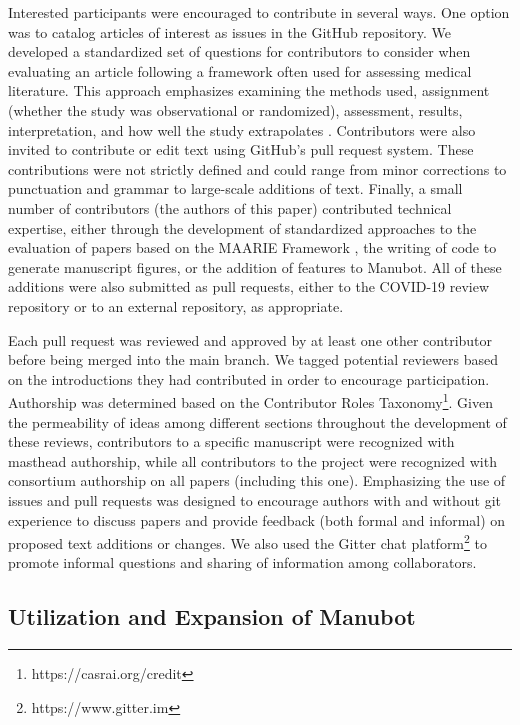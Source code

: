 \documentclass[twocolumn]{ceurart}
\begin{document}
Interested participants were encouraged to contribute in several ways.
One option was to catalog articles of interest as issues in the GitHub repository.
We developed a standardized set of questions for contributors to consider when evaluating an article following a framework often used for assessing medical literature.
This approach emphasizes examining the methods used, assignment (whether the study was observational or randomized), assessment, results, interpretation, and how well the study extrapolates \citep{17OQtAY4l}.
Contributors were also invited to contribute or edit text using GitHub's pull request system.
These contributions were not strictly defined and could range from minor corrections to punctuation and grammar to large-scale additions of text.
Finally, a small number of contributors (the authors of this paper) contributed technical expertise, either through the development of standardized approaches to the evaluation of papers based on the MAARIE Framework \citep{k1GJLUxP}, the writing of code to generate manuscript figures, or the addition of features to Manubot.
All of these additions were also submitted as pull requests, either to the COVID-19 review repository or to an external repository, as appropriate.

Each pull request was reviewed and approved by at least one other contributor before being merged into the main branch.
We tagged potential reviewers based on the introductions they had contributed in order to encourage participation.
Authorship was determined based on the Contributor Roles Taxonomy\footnote{https://casrai.org/credit}.
Given the permeability of ideas among different sections throughout the development of these reviews, contributors to a specific manuscript were recognized with masthead authorship, while all contributors to the project were recognized with consortium authorship on all papers (including this one).
Emphasizing the use of issues and pull requests was designed to encourage authors with and without git experience to discuss papers and provide feedback (both formal and informal) on proposed text additions or changes.
We also used the Gitter chat platform\footnote{https://www.gitter.im} to promote informal questions and sharing of information among collaborators.

\hypertarget{utilization-and-expansion-of-manubot}{%
\subsection{Utilization and Expansion of Manubot}\label{utilization-and-expansion-of-manubot}}
\end{document}
